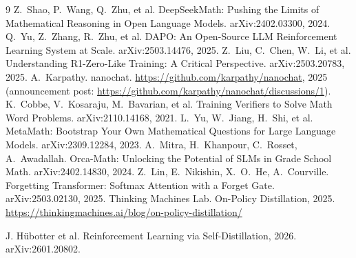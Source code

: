 \documentclass[10pt]{article}
\begin{document}
\begin{thebibliography}{9}\small
{} Z.\ Shao, P.\ Wang, Q.\ Zhu, et al. DeepSeekMath: Pushing the Limits of Mathematical Reasoning in Open Language Models. arXiv:2402.03300, 2024.
 Q.\ Yu, Z.\ Zhang, R.\ Zhu, et al. DAPO: An Open-Source LLM Reinforcement Learning System at Scale. arXiv:2503.14476, 2025.
 Z.\ Liu, C.\ Chen, W.\ Li, et al. Understanding R1-Zero-Like Training: A Critical Perspective. arXiv:2503.20783, 2025.
 A.\ Karpathy. nanochat. \url{https://github.com/karpathy/nanochat}, 2025 (announcement post: \url{https://github.com/karpathy/nanochat/discussions/1}).
 K.\ Cobbe, V.\ Kosaraju, M.\ Bavarian, et al. Training Verifiers to Solve Math Word Problems. arXiv:2110.14168, 2021.
 L.\ Yu, W.\ Jiang, H.\ Shi, et al. MetaMath: Bootstrap Your Own Mathematical Questions for Large Language Models. arXiv:2309.12284, 2023.
 A.\ Mitra, H.\ Khanpour, C.\ Rosset, A.\ Awadallah. Orca-Math: Unlocking the Potential of SLMs in Grade School Math. arXiv:2402.14830, 2024.
 Z.\ Lin, E.\ Nikishin, X.\ O.\ He, A.\ Courville. Forgetting Transformer: Softmax Attention with a Forget Gate. arXiv:2503.02130, 2025.
Thinking Machines Lab.
On-Policy Distillation, 2025.
\url{https://thinkingmachines.ai/blog/on-policy-distillation/}

J. H\"ubotter et al.
Reinforcement Learning via Self-Distillation, 2026.
arXiv:2601.20802.
\end{thebibliography}
\end{document}
